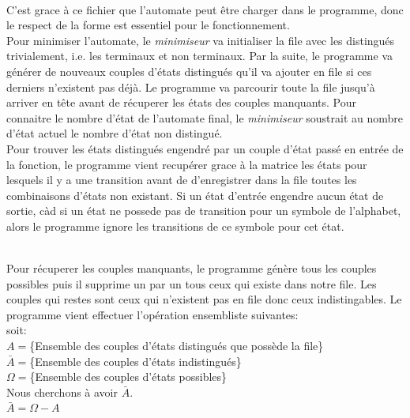 \documentclass[a4paper]{article}
\begin{document}
\fbox{
	
}\\

C'est grace à ce fichier que l'automate peut être charger dans le programme, donc le respect
de la forme est essentiel pour le fonctionnement.\\

Pour minimiser l'automate, le \textit{minimiseur} va initialiser la file avec les distingués
trivialement, i.e. les terminaux et non terminaux. Par la suite, le programme va générer de
nouveaux couples d'états distingués qu'il va ajouter en file si ces derniers n'existent pas
déjà. Le programme va parcourir toute la file jusqu'à arriver en tête avant de récuperer les
états des couples manquants. Pour connaitre le nombre d'état de l'automate final, le \textit{minimiseur}
soustrait au nombre d'état actuel le nombre d'état non distingué.\\

Pour trouver les états distingués engendré par un couple d'état passé en entrée de la fonction,
le programme vient recupérer grace
à la matrice les états pour lesquels il y a une transition avant de d'enregistrer dans la file toutes
les combinaisons d'états non existant. Si un état d'entrée engendre aucun état de sortie, càd
si un état ne possede pas de transition pour un symbole de l'alphabet, alors
le programme ignore les transitions de ce symbole pour cet état.

\fbox{
	
}\\

Pour récuperer les couples manquants, le programme génère tous les couples possibles puis
il supprime un par un tous ceux qui existe dans notre file. Les couples qui restes sont ceux
qui n'existent pas en file donc ceux indistingables. Le programme vient effectuer l'opération
ensembliste suivantes:\\

	soit:\\
	$A=$\{Ensemble des couples d'états distingués que possède la file\}\\
	$\bar{A}=$\{Ensemble des couples d'états indistingués\}\\
	$\Omega=$\{Ensemble des couples d'états possibles\}\\

	Nous cherchons à avoir $\bar{A}$.\\

	$\bar{A}=\Omega-A$
\end{document}
